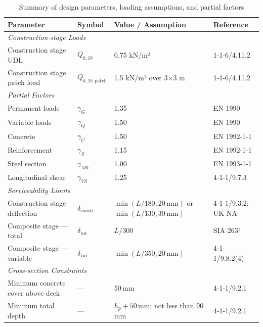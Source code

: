 \begin{table}[h!]
\scriptsize
\centering
\caption{Summary of design parameters, loading assumptions, and partial factors}
\label{tab:design_parameters}
\renewcommand{\arraystretch}{1.3}
\begin{tabular}{p{6.5cm} p{1.8cm} p{2.8cm} p{3.0cm}}
\hline
\textbf{Parameter} & \textbf{Symbol} & \textbf{Value / Assumption} & \textbf{Reference} \\
\hline
\multicolumn{4}{l}{\textit{Construction-stage Loads}} \\
\hline
Construction stage UDL          & $Q_{k,1b}$        & 0.75 kN/m²         & 1-1-6/4.11.2 \\
Construction stage patch load   & $Q_{k,1b,\mathrm{patch}}$ & 1.5 kN/m² over 3$\times$3 m & 1-1-6/4.11.2 \\
\hline
\multicolumn{4}{l}{\textit{Partial Factors}} \\
\hline
Permanent loads                 & $\gamma_G$        & 1.35               & EN 1990 \\
Variable loads                  & $\gamma_Q$        & 1.50               & EN 1990 \\
Concrete                        & $\gamma_C$        & 1.50               & EN 1992-1-1 \\
Reinforcement                   & $\gamma_S$        & 1.15               & EN 1992-1-1 \\
Steel section                   & $\gamma_{M0}$     & 1.00               & EN 1993-1-1 \\
Longitudinal shear              & $\gamma_{VS}$     & 1.25               & 4-1-1/9.7.3 \\
\hline
\multicolumn{4}{l}{\textit{Serviceability Limits}} \\
\hline
Construction stage deflection   & $\delta_\mathrm{constr}$  & $\min(L/180, 20\,\mathrm{mm})$ or $\min(L/130, 30\,\mathrm{mm})$    & 4-1-1/9.3.2; UK NA \\
Composite stage --- total       & $\delta_\mathrm{tot}$     & $L/300$                            & SIA 263$^{\ddagger}$ \\
Composite stage --- variable    & $\delta_\mathrm{var}$     & $\min(L/350, 20\,\mathrm{mm})$    & 4-1-1/9.8.2(4) \\
\hline
\multicolumn{4}{l}{\textit{Cross-section Constraints}} \\
\hline
Minimum concrete cover above deck & ---             & 50\,mm                            & 4-1-1/9.2.1 \\
Minimum total depth              & ---             & $h_p + 50$\,mm; not less than 90\,mm & 4-1-1/9.2.1 \\

\end{tabular}
\end{table}
